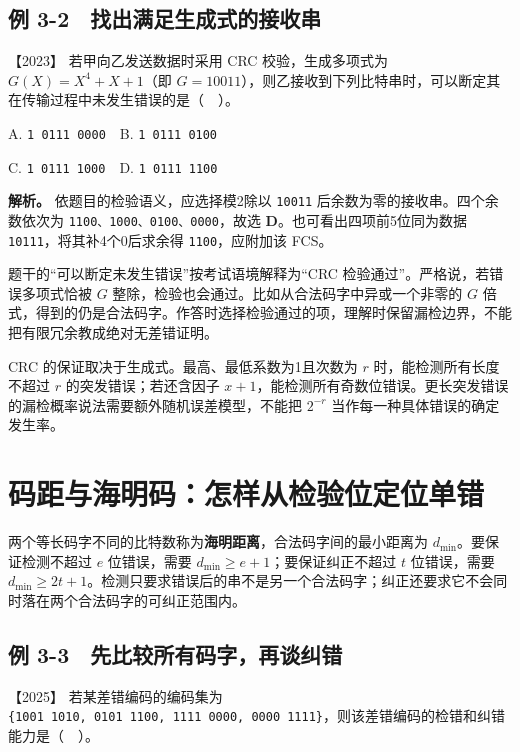 \subsection{例 3-2　找出满足生成式的接收串}\label{cn-ex3-2}

\noindent{}【2023】 若甲向乙发送数据时采用 CRC 校验，生成多项式为 \(G(X)=X^4+X+1\)（即 \(G=10011\)），则乙接收到下列比特串时，可以断定其在传输过程中未发生错误的是（　）。

A. \texttt{1\ 0111\ 0000}　B. \texttt{1\ 0111\ 0100}

C. \texttt{1\ 0111\ 1000}　D. \texttt{1\ 0111\ 1100}


\textbf{解析。} 依题目的检验语义，应选择模2除以 \texttt{10011} 后余数为零的接收串。四个余数依次为 \texttt{1100、1000、0100、0000}，故选 \textbf{D}。也可看出四项前5位同为数据 \texttt{10111}，将其补4个0后求余得 \texttt{1100}，应附加该 FCS。

题干的``可以断定未发生错误''按考试语境解释为``CRC 检验通过''。严格说，若错误多项式恰被 \(G\) 整除，检验也会通过。比如从合法码字中异或一个非零的 \(G\) 倍式，得到的仍是合法码字。作答时选择检验通过的项，理解时保留漏检边界，不能把有限冗余教成绝对无差错证明。

CRC 的保证取决于生成式。最高、最低系数为1且次数为 \(r\) 时，能检测所有长度不超过 \(r\) 的突发错误；若还含因子 \(x+1\)，能检测所有奇数位错误。更长突发错误的漏检概率说法需要额外随机误差模型，不能把 \(2^{-r}\) 当作每一种具体错误的确定发生率。

\section{码距与海明码：怎样从检验位定位单错}\label{cn-03-04}

两个等长码字不同的比特数称为\textbf{海明距离}，合法码字间的最小距离为 \(d_{\min}\)。要保证检测不超过 \(e\) 位错误，需要 \(d_{\min}\ge e+1\)；要保证纠正不超过 \(t\) 位错误，需要 \(d_{\min}\ge2t+1\)。检测只要求错误后的串不是另一个合法码字；纠正还要求它不会同时落在两个合法码字的可纠正范围内。

\subsection{例 3-3　先比较所有码字，再谈纠错}\label{cn-ex3-3}

\noindent{}【2025】 若某差错编码的编码集为 \texttt{\{1001\ 1010,}\allowbreak{}\texttt{\ 0101\ 1100,}\allowbreak{}\texttt{\ 1111\ 0000,}\allowbreak{}\texttt{\ 0000\ 1111\}}，则该差错编码的检错和纠错能力是（　）。

